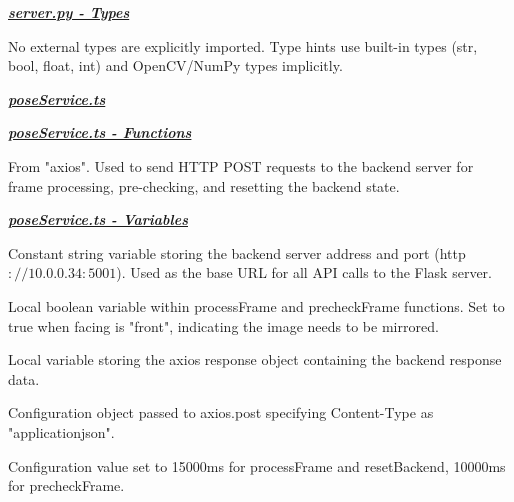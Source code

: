 \documentclass[12pt, titlepage]{article}
\begin{document}
\noindent \textbf{\underline{\textit{server.py - Types}}}\\
\begin{description}[style=nextline, leftmargin=2.5cm]
\item[\texttt{None}] 
    No external types are explicitly imported. Type hints use built-in types (str, bool, float, int) and OpenCV/NumPy types implicitly.
\end{description}
\noindent \textbf{\textit{\underline{poseService.ts}}}

\noindent \textbf{\underline{\textit{poseService.ts - Functions}}}\\
\begin{description}[style=nextline, leftmargin=2.5cm]
\item[\texttt{axios.post}] 
    From "axios". Used to send HTTP POST requests to the backend server for frame processing, pre-checking, and resetting the backend state.
\end{description}

\noindent \textbf{\underline{\textit{poseService.ts - Variables}}}\\
\begin{description}[style=nextline, leftmargin=2.5cm]
\item[\texttt{SERVER\_URL}] 
    Constant string variable storing the backend server address and port (http$://10.0.0.34:5001$). Used as the base URL for all API calls to the Flask server.

\item[\texttt{mirrored}] 
    Local boolean variable within processFrame and precheckFrame functions. Set to true when facing is "front", indicating the image needs to be mirrored.

\item[\texttt{res}] 
    Local variable storing the axios response object containing the backend response data.

\item[\texttt{headers}] 
    Configuration object passed to axios.post specifying Content-Type as "application\/json".

\item[\texttt{timeout}] 
    Configuration value set to 15000ms for processFrame and resetBackend, 10000ms for precheckFrame.
\end{description}
\end{document}
